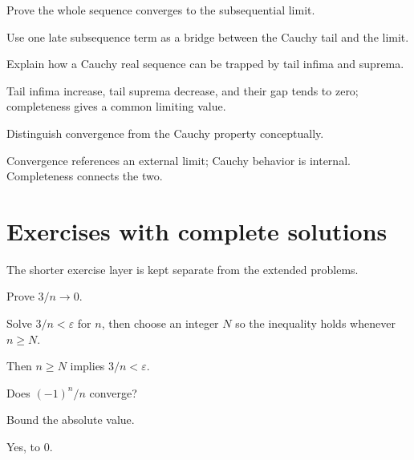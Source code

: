 \begin{problem}\label{prob:ii03-problem-10}
Prove the whole sequence converges to the subsequential limit.
\end{problem}
\begin{solution}
Use one late subsequence term as a bridge between the Cauchy tail and the limit.
\end{solution}

\begin{problem}\label{prob:ii03-problem-11}
Explain how a Cauchy real sequence can be trapped by tail infima and suprema.
\end{problem}
\begin{solution}
Tail infima increase, tail suprema decrease, and their gap tends to zero; completeness gives a common limiting value.
\end{solution}

\begin{problem}\label{prob:ii03-problem-12}
Distinguish convergence from the Cauchy property conceptually.
\end{problem}
\begin{solution}
Convergence references an external limit; Cauchy behavior is internal. Completeness connects the two.
\end{solution}

\section{Exercises with complete solutions}
The shorter exercise layer is kept separate from the extended problems.

\begin{exercise}\label{exr:ii03-01}
Prove $3/n\to0$.
\end{exercise}
\begin{hint}
Solve \(3/n<\varepsilon\) for \(n\), then choose an integer \(N\) so the inequality holds whenever \(n\ge N\).
\end{hint}
\begin{solution}
Then $n\ge N$ implies $3/n<\varepsilon$.
\end{solution}

\begin{exercise}\label{exr:ii03-02}
Does $(-1)^n/n$ converge?
\end{exercise}
\begin{hint}
Bound the absolute value.
\end{hint}
\begin{solution}
Yes, to $0$.
\end{solution}

